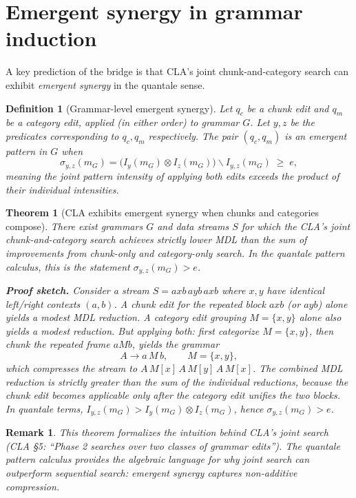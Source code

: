 \documentclass[11pt]{article}
\newtheorem{definition}{Definition}
\newtheorem{theorem}{Theorem}
\newtheorem{remark}{Remark}
\begin{document}
\section{Emergent synergy in grammar induction}

A key prediction of the bridge is that CLA's joint chunk-and-category search can exhibit \emph{emergent synergy} in the quantale sense.

\begin{definition}[Grammar-level emergent synergy]
\label{def:grammar-synergy}
Let $q_c$ be a chunk edit and $q_m$ be a category edit, applied (in either order) to grammar $G$.  Let $y, z$ be the predicates corresponding to $q_c, q_m$ respectively.  The pair $(q_c, q_m)$ is an \emph{emergent pattern} in $G$ when
\[
  \sigma_{y,z}(m_G) = \bigl(I_y(m_G) \otimes I_z(m_G)\bigr) \backslash I_{y,z}(m_G) \;\geq\; e,
\]
meaning the joint pattern intensity of applying both edits exceeds the product of their individual intensities.
\end{definition}

\begin{theorem}[CLA exhibits emergent synergy when chunks and categories compose]
\label{thm:emergent-synergy}
There exist grammars $G$ and data streams $S$ for which the CLA's joint chunk-and-category search achieves strictly lower MDL than the sum of improvements from chunk-only and category-only search.  In the quantale pattern calculus, this is the statement $\sigma_{y,z}(m_G) > e$.

\medskip
\noindent\textbf{Proof sketch.}
Consider a stream $S = a x b \, a y b \, a x b$ where $x, y$ have identical left/right contexts $(a, b)$.  A chunk edit for the repeated block $a x b$ (or $a y b$) alone yields a modest MDL reduction.  A category edit grouping $M = \{x, y\}$ alone also yields a modest reduction.  But applying both: first categorize $M = \{x, y\}$, then chunk the repeated frame $a M b$, yields the grammar
\[
  A \to a\, M\, b, \qquad M = \{x, y\},
\]
which compresses the stream to $A\, M[x]\, A\, M[y]\, A\, M[x]$.  The combined MDL reduction is strictly greater than the sum of the individual reductions, because the chunk edit becomes applicable only after the category edit unifies the two blocks.  In quantale terms, $I_{y,z}(m_G) > I_y(m_G) \otimes I_z(m_G)$, hence $\sigma_{y,z}(m_G) > e$.
\end{theorem}

\begin{remark}
This theorem formalizes the intuition behind CLA's joint search (CLA \S 5: ``Phase 2 searches over two classes of grammar edits'').  The quantale pattern calculus provides the algebraic language for why joint search can outperform sequential search: emergent synergy captures non-additive compression.
\end{remark}
\end{document}
